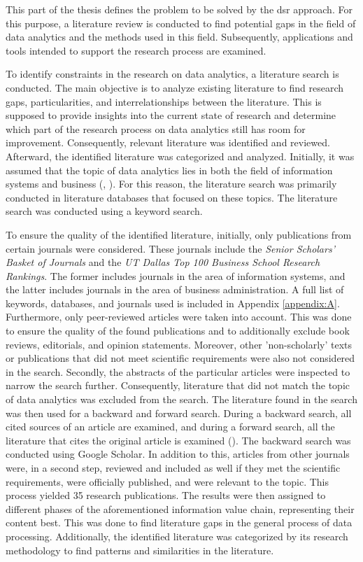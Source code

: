 This part of the thesis defines the problem to be solved by the \ac{dsr} approach. For this purpose, a literature review is conducted to find potential gaps in the field of data analytics and the methods used in this field. Subsequently, applications and tools intended to support the research process are examined.

To identify constraints in the research on data analytics, a literature search is conducted. The main objective is to analyze existing literature to find research gaps, particularities, and interrelationships between the literature. This is supposed to provide insights into the current state of research and determine which part of the research process on data analytics still has room for improvement. Consequently, relevant literature was identified and reviewed. Afterward, the identified literature was categorized and analyzed. Initially, it was assumed that the topic of data analytics lies in both the field of information systems and business (\cite{Abbasi.2016}, \cite{Levina.2005}). For this reason, the literature search was primarily conducted in literature databases that focused on these topics. The literature search was conducted using a keyword search.

To ensure the quality of the identified literature, initially, only publications from certain journals were considered. These journals include the \textit{Senior Scholars' Basket of Journals} and the \textit{UT Dallas Top 100 Business School Research Rankings}. The former includes journals in the area of information systems, and the latter includes journals in the area of business administration. A full list of keywords, databases, and journals used is included in Appendix \ref{appendix:A}. Furthermore, only peer-reviewed articles were taken into account. This was done to ensure the quality of the found publications and to additionally exclude book reviews, editorials, and opinion statements. Moreover, other 'non-scholarly' texts or publications that did not meet scientific requirements were also not considered in the search. Secondly, the abstracts of the particular articles were inspected to narrow the search further. Consequently, literature that did not match the topic of data analytics was excluded from the search. The literature found in the search was then used for a backward and forward search. During a backward search, all cited sources of an article are examined, and during a forward search, all the literature that cites the original article is examined (\cite{Webster.2002}). The backward search was conducted using Google Scholar. In addition to this, articles from other journals were, in a second step, reviewed and included as well if they met the scientific requirements, were officially published, and were relevant to the topic. This process yielded 35 research publications. The results were then assigned to different phases of the aforementioned information value chain, representing their content best. This was done to find literature gaps in the general process of data processing. Additionally, the identified literature was categorized by its research methodology to find patterns and similarities in the literature.

